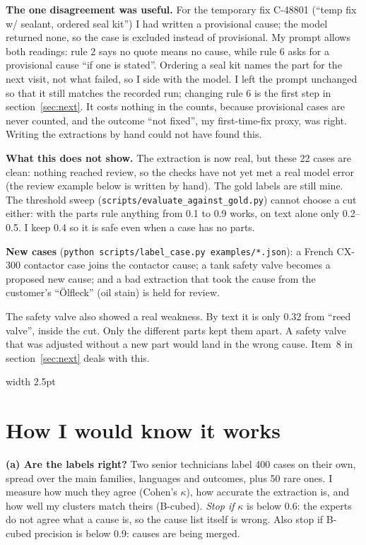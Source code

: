 \documentclass[11pt,a4paper]{article}
\newenvironment{callout}[1][accent]
  {\def\calloutcolor{#1}\par\smallskip\noindent
   \begin{lrbox}{\calloutbox}\begin{minipage}{\dimexpr\linewidth-2\fboxsep-11pt\relax}}
  {\end{minipage}\end{lrbox}%
   \colorbox{\calloutcolor!6}{\textcolor{\calloutcolor}{\vrule width 2.5pt}\hspace{8.5pt}\usebox{\calloutbox}}%
   \par\smallskip}
\begin{document}
\textbf{The one disagreement was useful.} For the temporary fix C-48801 (“temp fix w/ sealant, ordered seal kit”) I had written a provisional cause; the model returned none, so the case is excluded instead of provisional. My prompt allows both readings: rule 2 says no quote means no cause, while rule 6 asks for a provisional cause “if one is stated”. Ordering a seal kit names the part for the next visit, not what failed, so I side with the model. I left the prompt unchanged so that it still matches the recorded run; changing rule 6 is the first step in section~\ref{sec:next}. It costs nothing in the counts, because provisional cases are never counted, and the outcome “not fixed”, my first-time-fix proxy, was right. Writing the extractions by hand could not have found this.

\textbf{What this does not show.} The extraction is now real, but these 22 cases are clean: nothing reached review, so the checks have not yet met a real model error (the review example below is written by hand). The gold labels are still mine. The threshold sweep (\texttt{scripts/evaluate\_against\_gold.py}) cannot choose a cut either: with the parts rule anything from 0.1 to 0.9 works, on text alone only 0.2--0.5. I keep 0.4 so it is safe even when a case has no parts.

\textbf{New cases} (\texttt{python scripts/label\_case.py examples/*.json}): a French CX-300 contactor case joins the contactor cause; a tank safety valve becomes a proposed new cause; and a bad extraction that took the cause from the customer's “Ölfleck” (oil stain) is held for review.

\begin{callout}
The safety valve also showed a real weakness. By text it is only 0.32 from “reed valve”, inside the cut. Only the different parts kept them apart. A safety valve that was adjusted without a new part would land in the wrong cause. Item~8 in section~\ref{sec:next} deals with this.
\end{callout}

\section{How I would know it works}\label{sec:works}

\textbf{(a) Are the labels right?} Two senior technicians label 400 cases on their own, spread over the main families, languages and outcomes, plus 50 rare ones. I measure how much they agree (Cohen's $\kappa$), how accurate the extraction is, and how well my clusters match theirs (B-cubed). \emph{Stop if} $\kappa$ is below 0.6: the experts do not agree what a cause is, so the cause list itself is wrong. Also stop if B-cubed precision is below 0.9: causes are being merged.
\end{document}
